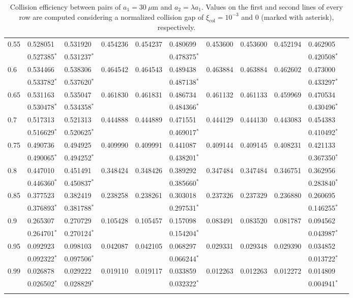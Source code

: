 \documentclass[../thesis.tex]{subfiles}
\begin{document}
\begin{landscape}
\begin{longtable}{lllllllllll}
 0.55 & 0.528051 & 0.531920 & 0.454236 & 0.454237 & 0.480699 & 0.453600 & 0.453600 & 0.452194 & 0.462905
 \\
 & 0.527385$^*$ & 0.531237$^*$ & & & 0.478375$^*$ & & & & 0.420508$^*$
 \\
 0.6 & 0.534466 & 0.538306 & 0.464542 & 0.464543 & 0.489438 & 0.463884 & 0.463884 & 0.462602 & 0.473000
 \\
 & 0.533782$^*$ & 0.537620$^*$ & & & 0.487138$^*$ & & & & 0.433297$^*$
 \\
 0.65 & 0.531163 & 0.535047 & 0.461830 & 0.461831 & 0.486734 & 0.461132 & 0.461133 & 0.459969 & 0.470534
 \\
 & 0.530478$^*$ & 0.534358$^*$ & & & 0.484366$^*$ & & & & 0.430496$^*$
 \\
 0.7 & 0.517313 & 0.521313 & 0.444888 & 0.444889 & 0.471551 & 0.444129 & 0.444130 & 0.443083 & 0.454383
 \\
 & 0.516629$^*$ & 0.520625$^*$ & & & 0.469017$^*$ & & & & 0.410492$^*$
 \\
 0.75 & 0.490736 & 0.494925 & 0.409990 & 0.409991 & 0.441087 & 0.409144 & 0.409145 & 0.408231 & 0.421133
 \\
 & 0.490065$^*$ & 0.494252$^*$ & & & 0.438201$^*$ & & & & 0.367350$^*$
 \\
 0.8 & 0.447010 & 0.451491 & 0.348424 & 0.348426 & 0.389292 & 0.347484 & 0.347484 & 0.346751 & 0.362956
 \\
 & 0.446360$^*$ & 0.450837$^*$ & & & 0.385660$^*$ & & & & 0.283840$^*$
 \\
 0.85 & 0.377523 & 0.382419 & 0.238258 & 0.238261 & 0.303018 & 0.237326 & 0.237329 & 0.236880 & 0.260695
 \\
 & 0.376893$^*$ & 0.381788$^*$ & & & 0.297531$^*$ & & & & 0.146255$^*$
 \\
 0.9 & 0.265307 & 0.270729 & 0.105428 & 0.105457 & 0.157098 & 0.083491 & 0.083520 & 0.081787 & 0.094562
 \\
 & 0.264701$^*$ & 0.270124$^*$ & & & 0.154204$^*$ & & & & 0.043987$^*$
 \\
 0.95 & 0.092923 & 0.098103 & 0.042087 & 0.042105 & 0.068297 & 0.029331 & 0.029348 & 0.029390 & 0.034852
 \\
 & 0.092322$^*$ & 0.097506$^*$ & & & 0.066244$^*$ & & & & 0.013722$^*$
 \\
 0.99 & 0.026878 & 0.029222 & 0.019110 & 0.019117 & 0.033859 & 0.012263 & 0.012263 & 0.012272 & 0.014809
 \\
 & 0.026502$^*$ & 0.028829$^*$ & & & 0.032322$^*$ & & & & 0.004941$^*$
 \\ \hline
 \caption{Collision efficiency between pairs of $a_1=30~\mu$m and $a_2=\lambda a_1$. Values on the first and second lines of every row are computed considering a normalized collision gap of $\xi_\text{col}=10^{-3}$ and $0$ (marked with asterisk), respectively.}
 \label{tab:E30}
\end{longtable}%

\end{landscape}
\restoregeometry
\renewcommand{\arraystretch}{1}

%
%
\newpage
\end{document}
